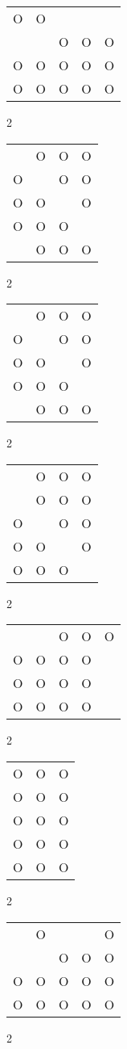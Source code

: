 \begin{tabular}{|m{0.2cm}m{0.2cm}m{0.2cm}m{0.2cm}m{0.2cm}|}\hline
O&O& & & \\
 & &O&O&O\\
O&O&O&O&O\\
O&O&O&O&O\\
\hline\end{tabular}2
\begin{tabular}{|m{0.2cm}m{0.2cm}m{0.2cm}m{0.2cm}|}\hline
 &O&O&O\\
O& &O&O\\
O&O& &O\\
O&O&O& \\
 &O&O&O\\
\hline\end{tabular}2
\begin{tabular}{|m{0.2cm}m{0.2cm}m{0.2cm}m{0.2cm}|}\hline
 &O&O&O\\
O& &O&O\\
O&O& &O\\
O&O&O& \\
 &O&O&O\\
\hline\end{tabular}2
\begin{tabular}{|m{0.2cm}m{0.2cm}m{0.2cm}m{0.2cm}|}\hline
 &O&O&O\\
 &O&O&O\\
O& &O&O\\
O&O& &O\\
O&O&O& \\
\hline\end{tabular}2
\begin{tabular}{|m{0.2cm}m{0.2cm}m{0.2cm}m{0.2cm}m{0.2cm}|}\hline
 & &O&O&O\\
O&O&O&O& \\
O&O&O&O& \\
O&O&O&O& \\
\hline\end{tabular}2
\begin{tabular}{|m{0.2cm}m{0.2cm}m{0.2cm}|}\hline
O&O&O\\
O&O&O\\
O&O&O\\
O&O&O\\
O&O&O\\
\hline\end{tabular}2
\begin{tabular}{|m{0.2cm}m{0.2cm}m{0.2cm}m{0.2cm}m{0.2cm}|}\hline
 &O& & &O\\
 & &O&O&O\\
O&O&O&O&O\\
O&O&O&O&O\\
\hline\end{tabular}2
